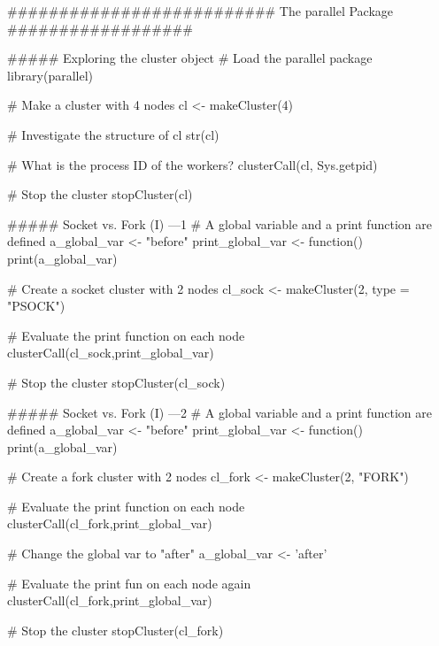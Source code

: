 ##########################  The parallel Package   ##################

##### Exploring the cluster object
# Load the parallel package
library(parallel)

# Make a cluster with 4 nodes
cl <- makeCluster(4)

# Investigate the structure of cl
str(cl)

# What is the process ID of the workers?
clusterCall(cl, Sys.getpid)

# Stop the cluster
stopCluster(cl)



##### Socket vs. Fork (I) ---1
# A global variable and a print function are defined
a_global_var <- "before"
print_global_var <- function() print(a_global_var)

# Create a socket cluster with 2 nodes
cl_sock <- makeCluster(2, type = "PSOCK")

# Evaluate the print function on each node
  clusterCall(cl_sock,print_global_var)

# Stop the cluster
stopCluster(cl_sock)



##### Socket vs. Fork (I) ---2
# A global variable and a print function are defined
a_global_var <- "before"
print_global_var <- function() print(a_global_var)

# Create a fork cluster with 2 nodes
cl_fork <- makeCluster(2, "FORK")

# Evaluate the print function on each node
clusterCall(cl_fork,print_global_var)

# Change the global var to "after"
a_global_var <- 'after'

# Evaluate the print fun on each node again
clusterCall(cl_fork,print_global_var)

# Stop the cluster
stopCluster(cl_fork)

